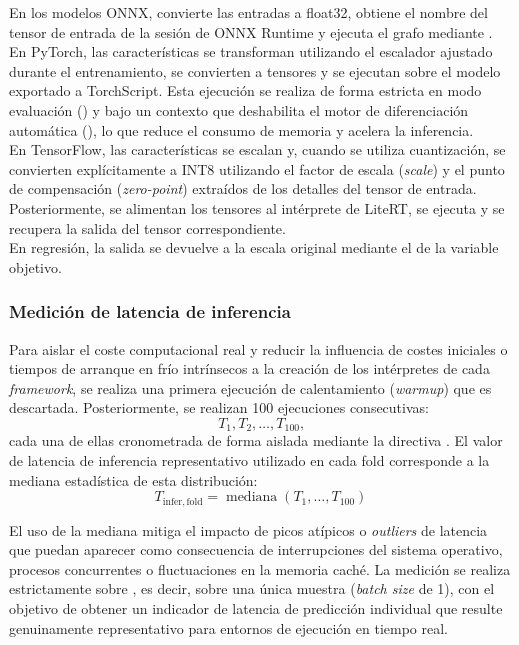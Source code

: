 \documentclass[a4paper,12pt,twoside,final]{book}
\begin{document}
En los modelos ONNX,  convierte las entradas a float32, obtiene el nombre del tensor de entrada de la
sesión de ONNX Runtime y ejecuta el grafo mediante .\\

En PyTorch, las características se transforman utilizando el escalador ajustado durante el entrenamiento, se convierten
a tensores y se ejecutan sobre el modelo exportado a TorchScript. Esta ejecución se realiza de forma estricta en modo
evaluación () y bajo un contexto que deshabilita el motor de diferenciación automática
(), lo que reduce el consumo de memoria y acelera la inferencia.\\

En TensorFlow, las características se escalan y, cuando se utiliza cuantización, se convierten explícitamente a INT8
utilizando el factor de escala (\textit{scale}) y el punto de compensación (\textit{zero-point}) extraídos de los
detalles del tensor de entrada. Posteriormente, se alimentan los tensores al intérprete de LiteRT, se ejecuta
 y se recupera la salida del tensor correspondiente.\\

En regresión, la salida se devuelve a la escala original mediante el  de la variable objetivo.

\subsubsection{Medición de latencia de inferencia}
Para aislar el coste computacional real y reducir la influencia de costes iniciales o tiempos de arranque en frío
intrínsecos a la creación de los intérpretes de cada \textit{framework}, se realiza una primera ejecución de
calentamiento (\textit{warmup}) que es descartada. Posteriormente, se realizan 100 ejecuciones consecutivas:
\[
T_1, T_2, \ldots, T_{100}\text{,}
\]
cada una de ellas cronometrada de forma aislada mediante la directiva . El valor de latencia
de inferencia representativo utilizado en cada fold corresponde a la mediana estadística de esta distribución:
\[
T_{\mathrm{infer,fold}} = \operatorname{mediana}(T_1, \ldots, T_{100})
\]

El uso de la mediana mitiga el impacto de picos atípicos o \textit{outliers} de latencia que puedan aparecer como
consecuencia de interrupciones del sistema operativo, procesos concurrentes o fluctuaciones en la memoria caché. La
medición se realiza estrictamente sobre , es decir, sobre una única muestra (\textit{batch size} de 1),
con el objetivo de obtener un indicador de latencia de predicción individual que resulte genuinamente representativo
para entornos de ejecución en tiempo real.\\
\end{document}
